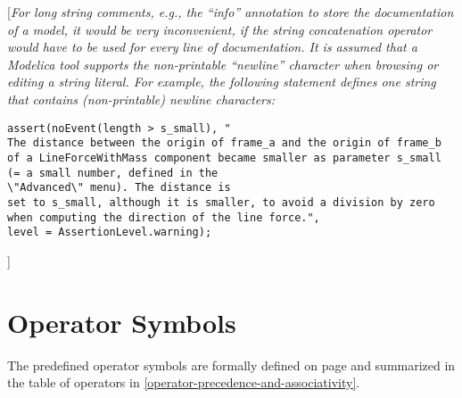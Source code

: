 {[}\emph{For long string comments, e.g., the ``info'' annotation to
store the documentation of a model, it would be very inconvenient, if
the string concatenation operator would have to be used for every line
of documentation. It is assumed that a Modelica tool supports the
non-printable ``newline'' character when browsing or editing a string
literal. For example, the following statement defines one string that
contains (non-printable) newline characters:}

\begin{lstlisting}[language=modelica]
assert(noEvent(length > s_small), "
The distance between the origin of frame_a and the origin of frame_b
of a LineForceWithMass component became smaller as parameter s_small
(= a small number, defined in the
\"Advanced\" menu). The distance is
set to s_small, although it is smaller, to avoid a division by zero
when computing the direction of the line force.",
level = AssertionLevel.warning);
\end{lstlisting}
]
\section{Operator Symbols}

The predefined operator symbols are formally defined on page \pageref{lexical-conventions} and
summarized in the table of operators in \autoref{operator-precedence-and-associativity}.

